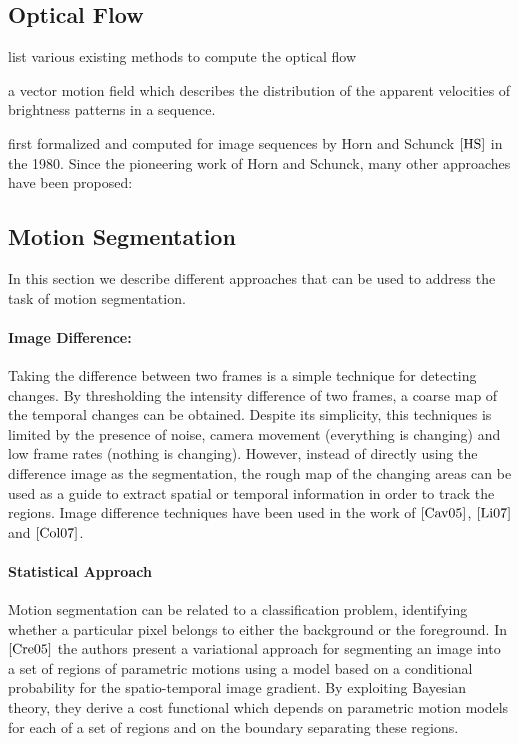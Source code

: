 \subsection{Optical Flow}
list various existing methods to compute the optical flow

a vector motion field which describes the distribution of the apparent velocities of brightness patterns in a sequence. 

first formalized and computed  for  image  sequences  by  Horn  and  Schunck $\cite{HS}$ in  the  1980. Since the pioneering work of Horn and Schunck, many other approaches have been proposed:

\subsection{Motion Segmentation}
In this section we describe different approaches that can be used to address the task of motion segmentation.

\paragraph{Image Difference:} Taking the difference between two frames is a simple technique for detecting changes. By thresholding the intensity difference of two frames, a coarse map of the temporal changes can be obtained. Despite its simplicity, this techniques is limited by the presence of noise, camera movement (everything is changing) and low frame rates (nothing is changing). However, instead of directly using the difference image as the segmentation, the rough map of the changing areas can be used as a guide to extract spatial or temporal information in order to track the regions. Image difference techniques have been used in the work of $\cite{Cav05}$, $\cite{Li07}$ and $\cite{Col07}$.

\paragraph{Statistical Approach} Motion segmentation can be related to a classification problem, identifying whether a particular pixel belongs to either the background or the foreground. In $\cite{Cre05}$ the authors present a variational approach for segmenting an image into a set of regions of parametric motions using a model based on a conditional probability for the spatio-temporal image gradient. By exploiting Bayesian theory, they derive a cost functional which depends on parametric motion models for each  of a set of regions and on the boundary separating these regions.


